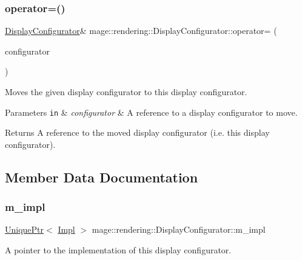 \subsubsection{\texorpdfstring{operator=()}{operator=()}\hspace{0.1cm}{\footnotesize\ttfamily [2/2]}}
{\footnotesize\ttfamily \hyperlink{classmage_1_1rendering_1_1_display_configurator}{Display\+Configurator}\& mage\+::rendering\+::\+Display\+Configurator\+::operator= (\begin{DoxyParamCaption}\item[{\hyperlink{classmage_1_1rendering_1_1_display_configurator}{Display\+Configurator} \&\&}]{configurator }\end{DoxyParamCaption})\hspace{0.3cm}{\ttfamily [delete]}}

Moves the given display configurator to this display configurator.


\begin{DoxyParams}[1]{Parameters}
\mbox{\tt in}  & {\em configurator} & A reference to a display configurator to move. \\
\hline
\end{DoxyParams}
\begin{DoxyReturn}{Returns}
A reference to the moved display configurator (i.\+e. this display configurator). 
\end{DoxyReturn}


\subsection{Member Data Documentation}
\hypertarget{classmage_1_1rendering_1_1_display_configurator_a07b64b1b3443e4350723990592de86e7}{}\label{classmage_1_1rendering_1_1_display_configurator_a07b64b1b3443e4350723990592de86e7} 
\subsubsection{\texorpdfstring{m\+\_\+impl}{m\_impl}}
{\footnotesize\ttfamily \hyperlink{namespacemage_a3316d7143a973e37adf1110f2e80ca31}{Unique\+Ptr}$<$ \hyperlink{classmage_1_1rendering_1_1_display_configurator_1_1_impl}{Impl} $>$ mage\+::rendering\+::\+Display\+Configurator\+::m\+\_\+impl\hspace{0.3cm}{\ttfamily [private]}}

A pointer to the implementation of this display configurator. 